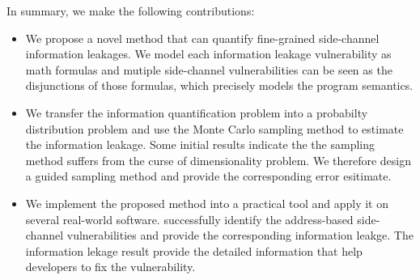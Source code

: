 In summary, we make the following contributions:

\begin{itemize}
	\item We propose a novel method that can quantify fine-grained side-channel
        information leakages. We model each information leakage vulnerability as math formulas and 
        mutiple side-channel vulnerabilities can be seen as the disjunctions of those formulas, which
        precisely models the program semantics.
        \item We transfer the information quantification problem into a probabilty distribution problem and 
        use the Monte Carlo sampling method to estimate the information leakage. Some initial results indicate the 
        the sampling method suffers from the curse of dimensionality problem. We therefore design a guided
        sampling method and provide the corresponding error esitimate.
	\item We implement the proposed method into a practical tool and apply it on several real-world software. \tool{} 
        successfully identify the address-based side-channel vulnerabilities and provide the corresponding
        information leakge. The information lekage result provide the detailed information that help developers
        to fix the vulnerability.
\end{itemize}



